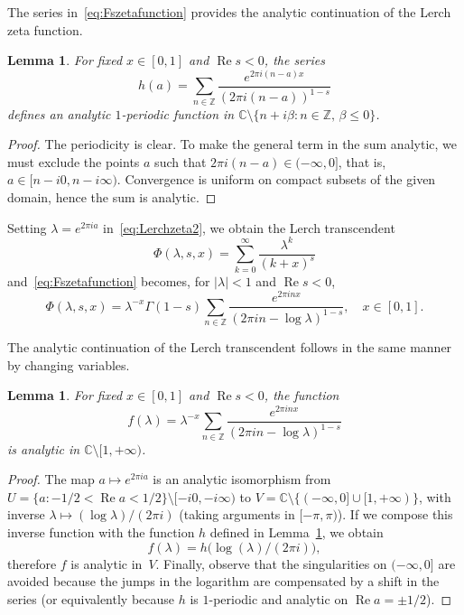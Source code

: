 \documentclass[11pt,a4paper,reqno]{amsart}
\newcommand{\C}{\mathbb{C}}
\newcommand{\Z}{\mathbb{Z}}
\renewcommand{\Re}{\operatorname{Re}}
\theoremstyle{plain}
\newtheorem{lemma}[theorem]{Lemma}
\theoremstyle{remark}
\numberwithin{equation}{section}
\begin{document}
The series in~\eqref{eq:Fszetafunction} provides the analytic continuation of the Lerch zeta function.

\begin{lemma}
\label{lem:prol1}
For fixed $x\in [0,1]$ and $\Re s<0$, the series
\begin{equation*}
  h(a) = \sum_{n\in\Z}\frac{e^{2\pi i(n-a)x}}{(2\pi i(n-a))^{1-s}}
\end{equation*}
defines an analytic $1$-periodic function in $\C\setminus\{n+i\beta:n\in\Z,\,\beta\leq 0\}$.
\end{lemma}

\begin{proof}
The periodicity is clear. To make the general term in the sum analytic, we must exclude the points $a$ such that $2\pi i(n-a)\in (-\infty,0]$, that is, $a\in [n-i0,n-i\infty)$. Convergence is uniform on compact subsets of the given domain, hence the sum is analytic.
\end{proof}

Setting $\lambda=e^{2\pi i a}$ in~\eqref{eq:Lerchzeta2}, we obtain the Lerch transcendent
\begin{equation}
\label{eq:Lerch2}
  \Phi(\lambda,s,x) = \sum_{k=0}^\infty\frac{\lambda^k}{(k+x)^s}
\end{equation}
and~\eqref{eq:Fszetafunction} becomes, for $|\lambda|<1$ and $\Re s<0$,
\begin{equation*}
 \Phi(\lambda,s,x) = \lambda^{-x} \Gamma(1-s) 
 \sum_{n\in\Z} \frac{e^{2\pi inx}}{(2\pi in-\log\lambda)^{1-s}},
 \quad x\in [0,1].
\end{equation*}

The analytic continuation of the Lerch transcendent follows in the same manner by changing variables. 

\begin{lemma}
For fixed  $x\in [0,1]$ and $\Re s<0$, the function
\begin{equation*}
  f(\lambda) = \lambda^{-x} \sum_{n\in\Z}\frac{e^{2\pi inx}}{(2\pi in-\log\lambda)^{1-s}}
\end{equation*}
is analytic in $\C\setminus [1,+\infty)$.
\end{lemma}

\begin{proof}
The map $a \mapsto e^{2\pi i a}$ is an analytic isomorphism from $U=\{a:-1/2<\Re a<1/2\}\setminus [-i0,-i\infty)$ to $V=\C\setminus\{(-\infty,0]\cup[1,+\infty)\}$, with inverse $\lambda \mapsto (\log\lambda)/(2\pi i)$ (taking arguments in $[-\pi,\pi)$). If we compose this inverse function with the function $h$ defined in Lemma~\ref{lem:prol1}, we obtain
\begin{equation*}
  f(\lambda) = h\big(\log(\lambda)/(2\pi i)\big),
\end{equation*}
therefore $f$ is analytic in~$V$. Finally, observe that the singularities on $(-\infty,0]$ are avoided because the jumps in the logarithm are compensated by a shift in the series (or equivalently because $h$ is $1$-periodic and analytic on $\Re a=\pm 1/2$).
\end{proof}
\end{document}
